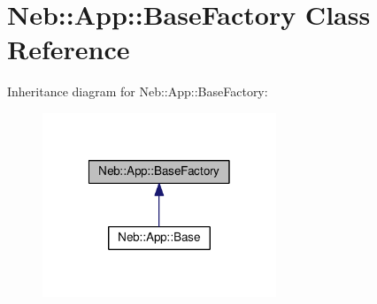 \hypertarget{classNeb_1_1App_1_1BaseFactory}{\section{Neb\-:\-:App\-:\-:Base\-Factory Class Reference}
\label{classNeb_1_1App_1_1BaseFactory}
}


Inheritance diagram for Neb\-:\-:App\-:\-:Base\-Factory\-:
\nopagebreak
\begin{figure}[H]
\begin{center}
\leavevmode
\includegraphics[width=198pt]{classNeb_1_1App_1_1BaseFactory__inherit__graph}
\end{center}
\end{figure}
